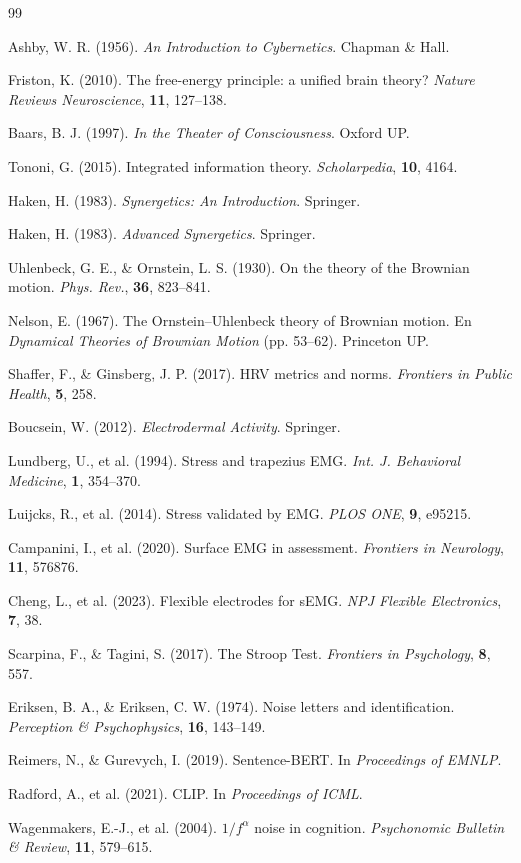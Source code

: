 \documentclass[10pt,a4paper,twocolumn]{article}
\theoremstyle{definition}
\theoremstyle{plain}
\begin{document}
\begin{thebibliography}{99}\small

Ashby, W. R. (1956). \emph{An Introduction to Cybernetics}. Chapman \& Hall.

Friston, K. (2010). The free-energy principle: a unified brain theory?
\emph{Nature Reviews Neuroscience}, \textbf{11}, 127–138.

Baars, B. J. (1997). \emph{In the Theater of Consciousness}. Oxford UP.

Tononi, G. (2015). Integrated information theory. \emph{Scholarpedia}, \textbf{10}, 4164.

Haken, H. (1983). \emph{Synergetics: An Introduction}. Springer.

Haken, H. (1983). \emph{Advanced Synergetics}. Springer.

Uhlenbeck, G. E., \& Ornstein, L. S. (1930). On the theory of the Brownian motion.
\emph{Phys. Rev.}, \textbf{36}, 823–841.

Nelson, E. (1967). The Ornstein–Uhlenbeck theory of Brownian motion.
En \emph{Dynamical Theories of Brownian Motion} (pp. 53–62). Princeton UP.

Shaffer, F., \& Ginsberg, J. P. (2017). HRV metrics and norms.
\emph{Frontiers in Public Health}, \textbf{5}, 258.

Boucsein, W. (2012). \emph{Electrodermal Activity}. Springer.

Lundberg, U., et al. (1994). Stress and trapezius EMG.
\emph{Int. J. Behavioral Medicine}, \textbf{1}, 354–370.

Luijcks, R., et al. (2014). Stress validated by EMG.
\emph{PLOS ONE}, \textbf{9}, e95215.

Campanini, I., et al. (2020). Surface EMG in assessment.
\emph{Frontiers in Neurology}, \textbf{11}, 576876.

Cheng, L., et al. (2023). Flexible electrodes for sEMG.
\emph{NPJ Flexible Electronics}, \textbf{7}, 38.

Scarpina, F., \& Tagini, S. (2017). The Stroop Test.
\emph{Frontiers in Psychology}, \textbf{8}, 557.

Eriksen, B. A., \& Eriksen, C. W. (1974). Noise letters and identification.
\emph{Perception \& Psychophysics}, \textbf{16}, 143–149.

Reimers, N., \& Gurevych, I. (2019). Sentence-BERT.
In \emph{Proceedings of EMNLP}.

Radford, A., et al. (2021). CLIP.
In \emph{Proceedings of ICML}.

Wagenmakers, E.-J., et al. (2004). $1/f^\alpha$ noise in cognition.
\emph{Psychonomic Bulletin \& Review}, \textbf{11}, 579–615.

\end{thebibliography}

\balance %
\end{document}
